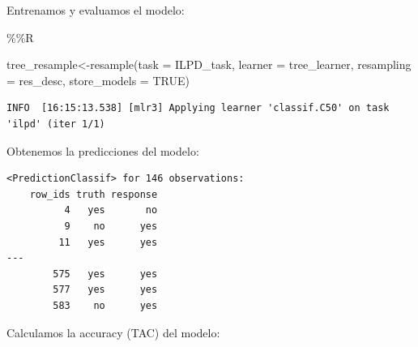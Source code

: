 \documentclass[
  11pt,
  a4paper,
]{article}
\newenvironment{Shaded}{\begin{snugshade}}{\end{snugshade}}
\newcommand{\AttributeTok}[1]{\textcolor[rgb]{0.77,0.63,0.00}{#1}}
\newcommand{\ConstantTok}[1]{\textcolor[rgb]{0.00,0.00,0.00}{#1}}
\newcommand{\DecValTok}[1]{\textcolor[rgb]{0.00,0.00,0.81}{#1}}
\newcommand{\FunctionTok}[1]{\textcolor[rgb]{0.00,0.00,0.00}{#1}}
\newcommand{\NormalTok}[1]{#1}
\newcommand{\OtherTok}[1]{\textcolor[rgb]{0.56,0.35,0.01}{#1}}
\newcommand{\SpecialCharTok}[1]{\textcolor[rgb]{0.00,0.00,0.00}{#1}}
\newcommand{\StringTok}[1]{\textcolor[rgb]{0.31,0.60,0.02}{#1}}
\begin{document}
Entrenamos y evaluamos el modelo:

\begin{Shaded}
\begin{Highlighting}[]
\SpecialCharTok{\%\%}\NormalTok{R}

\NormalTok{tree\_resample}\OtherTok{\textless{}{-}}\FunctionTok{resample}\NormalTok{(}\AttributeTok{task =}\NormalTok{ ILPD\_task, }\AttributeTok{learner =}\NormalTok{ tree\_learner, }\AttributeTok{resampling =}\NormalTok{ res\_desc, }\AttributeTok{store\_models =} \ConstantTok{TRUE}\NormalTok{)}
\end{Highlighting}
\end{Shaded}

\begin{verbatim}
INFO  [16:15:13.538] [mlr3] Applying learner 'classif.C50' on task 'ilpd' (iter 1/1)
\end{verbatim}

Obtenemos la predicciones del modelo:

\begin{Shaded}
\end{Shaded}

\begin{verbatim}
<PredictionClassif> for 146 observations:
    row_ids truth response
          4   yes       no
          9    no      yes
         11   yes      yes
---                       
        575   yes      yes
        577   yes      yes
        583    no      yes
\end{verbatim}

Calculamos la accuracy (TAC) del modelo:

\begin{Shaded}
\end{Shaded}
\end{document}
